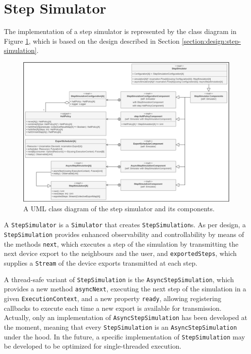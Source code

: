 
\section{Step Simulator}
\label{section:implementation:step-simulator}

The implementation of a step simulator is represented by the class diagram in
Figure \ref{figure:step-simulator-class-diagram}, which is based on the design
described in Section \ref{section:design:step-simulation}.

\begin{figure}[!ht]
  \centering
  \includegraphics[width=1\textwidth]{resources/figures/step-simulator-class-diagram.png}
  \caption{A UML class diagram of the step simulator and its components.}
  \label{figure:step-simulator-class-diagram}
\end{figure}

A \texttt{StepSimulator} is a \texttt{Simulator} that creates
\texttt{StepSimulation}s. As per design, a \texttt{StepSimulation} provides
enhanced observability and controllability by means of the methods
\texttt{next}, which executes a step of the simulation by transmitting the next
device export to the neighbours and the user, and \texttt{exportedSteps}, which
supplies a \texttt{Stream} of the device exports transmitted at each step.

A thread-safe variant of \texttt{StepSimulation} is the
\texttt{AsyncStepSimulation}, which provides a new method \texttt{asyncNext},
executing the next step of the simulation in a given \texttt{ExecutionContext},
and a new property \texttt{ready}, allowing registering callbacks to execute
each time a new export is available for transmission. Actually, only an
implementation of \texttt{AsyncStepSimulation} has been developed at the
moment, meaning that every \texttt{StepSimulation} is an
\texttt{AsyncStepSimulation} under the hood. In the future, a specific
implementation of \texttt{StepSimulation} may be developed to be optimized for
single-threaded execution.

